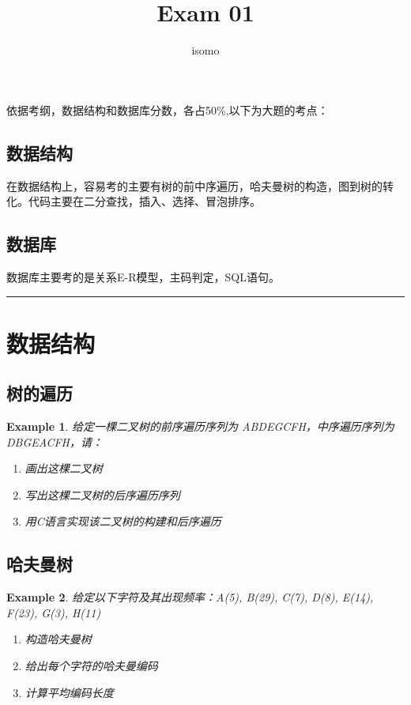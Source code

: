 \documentclass{../../note}
\title{Exam 01}
\author{isomo}
\newtheorem{example}{Example}
\begin{document}
\fontsize{12pt}{14.4pt}\selectfont

\maketitle
\tableofcontents
\newpage

依据考纲，数据结构和数据库分数，各占50\%,以下为大题的考点：

\subsection{数据结构}
在数据结构上，容易考的主要有树的前中序遍历，哈夫曼树的构造，图到树的转化。代码主要在二分查找，插入、选择、冒泡排序。

\subsection{数据库}
数据库主要考的是关系E-R模型，主码判定，SQL语句。

\noindent\rule{\textwidth}{1pt}

\section{数据结构}

\subsection{树的遍历}

\begin{example}
给定一棵二叉树的前序遍历序列为 ABDEGCFH，中序遍历序列为 DBGEACFH，请：
\begin{enumerate}
  \item 画出这棵二叉树
  \item 写出这棵二叉树的后序遍历序列
  \item 用C语言实现该二叉树的构建和后序遍历
\end{enumerate}
\end{example}

\subsection{哈夫曼树}

\begin{example}
给定以下字符及其出现频率：A(5), B(29), C(7), D(8), E(14), F(23), G(3), H(11)
\begin{enumerate}
  \item 构造哈夫曼树
  \item 给出每个字符的哈夫曼编码
  \item 计算平均编码长度
\end{enumerate}
\end{example}
\end{document}
